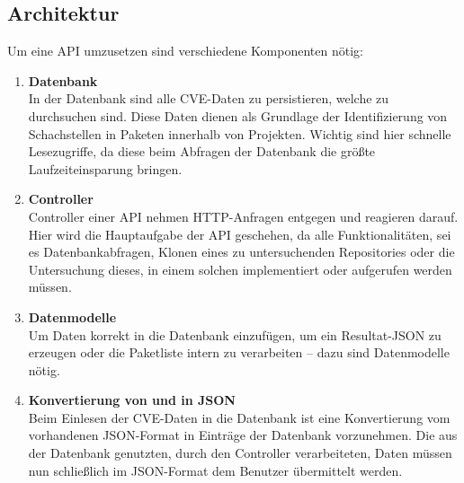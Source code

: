 \subsection{Architektur} \label{sec:Architektur}
    Um eine API umzusetzen sind verschiedene Komponenten nötig:
    \begin{enumerate}
        \item \textbf{Datenbank} \\
            In der Datenbank sind alle CVE-Daten zu persistieren, welche zu durchsuchen sind.
            Diese Daten dienen als Grundlage der Identifizierung von Schachstellen in Paketen innerhalb von Projekten.
            Wichtig sind hier schnelle Lesezugriffe, da diese beim Abfragen der Datenbank die größte Laufzeiteinsparung bringen. 
        \item \textbf{Controller} \\
            Controller einer API nehmen HTTP-Anfragen entgegen und reagieren darauf.
            Hier wird die Hauptaufgabe der API geschehen, da alle Funktionalitäten, sei es Datenbankabfragen, Klonen eines zu untersuchenden Repositories oder die Untersuchung dieses, in einem solchen implementiert oder aufgerufen werden müssen.
        \item \textbf{Datenmodelle} \\
            Um Daten korrekt in die Datenbank einzufügen, um ein Resultat-JSON zu erzeugen oder die Paketliste intern zu verarbeiten -- dazu sind Datenmodelle nötig.
        \item \textbf{Konvertierung von und in JSON} \\
            Beim Einlesen der CVE-Daten in die Datenbank ist eine Konvertierung vom vorhandenen JSON-Format in Einträge der Datenbank vorzunehmen.  
            Die aus der Datenbank genutzten, durch den Controller verarbeiteten, Daten müssen nun schließlich im JSON-Format dem Benutzer übermittelt werden.
    \end{enumerate}

